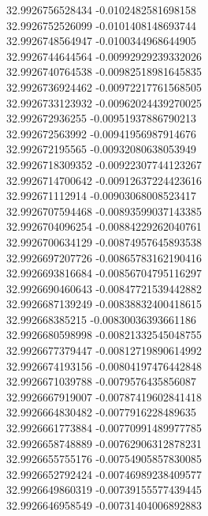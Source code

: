 {32.9926756528434	-0.0102482581698158\\
32.9926752526099	-0.0101408148693744\\
32.9926748564947	-0.0100344968644905\\
32.9926744644564	-0.00992929239332026\\
32.9926740764538	-0.00982518981645835\\
32.9926736924462	-0.00972217761568505\\
32.9926733123932	-0.00962024439270025\\
32.992672936255	-0.00951937886790213\\
32.992672563992	-0.00941956987914676\\
32.992672195565	-0.00932080638053949\\
32.9926718309352	-0.00922307744123267\\
32.9926714700642	-0.00912637224423616\\
32.992671112914	-0.00903068008523417\\
32.9926707594468	-0.00893599037143385\\
32.9926704096254	-0.00884229262040761\\
32.9926700634129	-0.00874957645893538\\
32.9926697207726	-0.00865783162190416\\
32.9926693816684	-0.00856704795116297\\
32.9926690460643	-0.00847721539442882\\
32.9926687139249	-0.00838832400418615\\
32.992668385215	-0.00830036393661186\\
32.9926680598998	-0.00821332545048755\\
32.9926677379447	-0.00812719890614992\\
32.9926674193156	-0.00804197476442848\\
32.9926671039788	-0.0079576435856087\\
32.9926667919007	-0.00787419602841418\\
32.9926664830482	-0.0077916228489635\\
32.9926661773884	-0.00770991489977785\\
32.9926658748889	-0.00762906312878231\\
32.9926655755176	-0.00754905857830085\\
32.9926652792424	-0.00746989238409577\\
32.9926649860319	-0.00739155577439445\\
32.9926646958549	-0.00731404006892883\\
}
